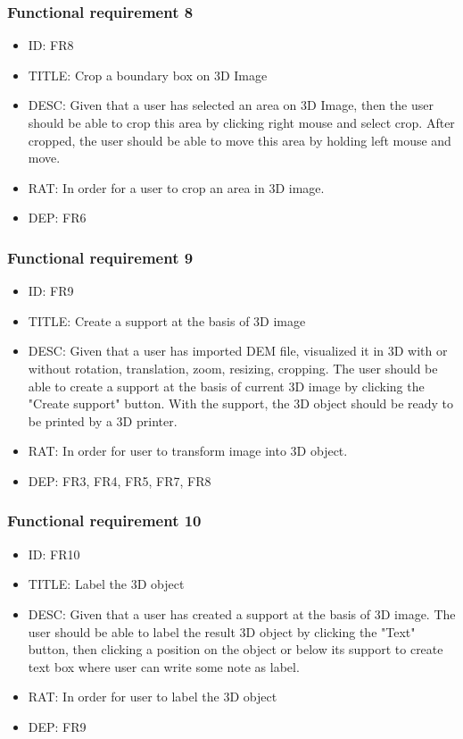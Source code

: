 \documentclass[11pt]{article}
\begin{document}
\subsubsection{Functional requirement 8}
\begin{itemize}
\item ID: FR8
\item TITLE: Crop a boundary box on 3D Image
\item DESC: Given that a user has selected an area on 3D Image, then the user should be able to crop this area by clicking right mouse and select crop. After cropped, the user should be able to move this area by holding left mouse and move.
\item RAT: In order for a user to crop an area in 3D image.
\item DEP: FR6
\end{itemize}
\subsubsection{Functional requirement 9}
\begin{itemize}
\item ID: FR9
\item TITLE: Create a support at the basis of 3D image
\item DESC: Given that a user has imported DEM file, visualized it in 3D with or without rotation, translation, zoom, resizing, cropping. The user should be able to create a support at the basis of current 3D image by clicking the "Create support" button. With the support, the 3D object should be ready to be printed by a 3D printer.
\item RAT: In order for user to transform image into 3D object.
\item DEP: FR3, FR4, FR5, FR7, FR8
\end{itemize}
\subsubsection{Functional requirement 10}
\begin{itemize}
\item ID: FR10
\item TITLE: Label the 3D object
\item DESC: Given that a user has created a support at the basis of 3D image. The user should be able to label the result 3D object by clicking the "Text" button, then clicking a position on the object or below its support to create text box where user can write some note as label.
\item RAT: In order for user to label the 3D object
\item DEP: FR9
\end{itemize}
\end{document}
